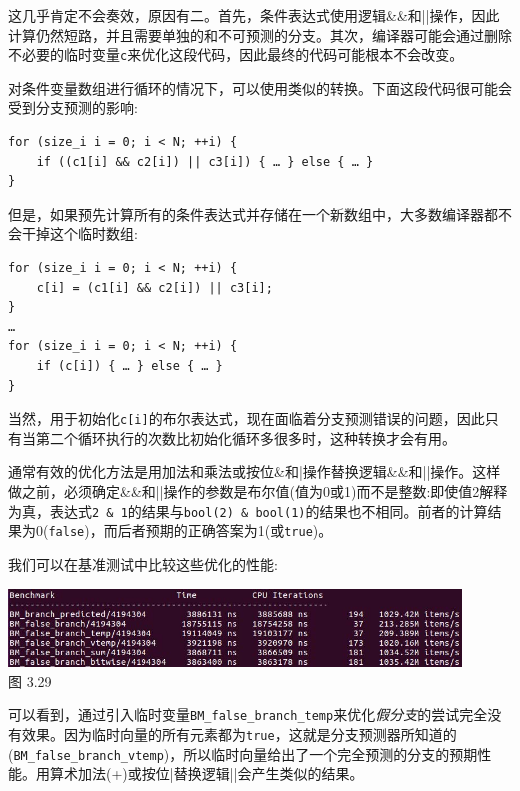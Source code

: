 这几乎肯定不会奏效，原因有二。首先，条件表达式使用逻辑\&\&和||操作，因此计算仍然短路，并且需要单独的和不可预测的分支。其次，编译器可能会通过删除不必要的临时变量\texttt{c}来优化这段代码，因此最终的代码可能根本不会改变。

对条件变量数组进行循环的情况下，可以使用类似的转换。下面这段代码很可能会受到分支预测的影响:

\begin{lstlisting}[style=styleCXX]
for (size_i i = 0; i < N; ++i) {
	if ((c1[i] && c2[i]) || c3[i]) { … } else { … }
}
\end{lstlisting}

但是，如果预先计算所有的条件表达式并存储在一个新数组中，大多数编译器都不会干掉这个临时数组:

\begin{lstlisting}[style=styleCXX]
for (size_i i = 0; i < N; ++i) {
	c[i] = (c1[i] && c2[i]) || c3[i];
}
…
for (size_i i = 0; i < N; ++i) {
	if (c[i]) { … } else { … }
}
\end{lstlisting}

当然，用于初始化\texttt{c[i]}的布尔表达式，现在面临着分支预测错误的问题，因此只有当第二个循环执行的次数比初始化循环多很多时，这种转换才会有用。

通常有效的优化方法是用加法和乘法或按位\&和|操作替换逻辑\&\&和||操作。这样做之前，必须确定\&\&和||操作的参数是布尔值(值为0或1)而不是整数:即使值2解释为真，表达式\texttt{2 \& 1}的结果与\texttt{bool(2) \& bool(1)}的结果也不相同。前者的计算结果为0(\texttt{false})，而后者预期的正确答案为1(或\texttt{true})。

我们可以在基准测试中比较这些优化的性能:

\begin{center}
\includegraphics[width=0.9\textwidth]{content/1/chapter3/images/29.jpg}\\
图 3.29
\end{center}

可以看到，通过引入临时变量\texttt{BM\_false\_branch\_temp}来优化\textit{假分支}的尝试完全没有效果。因为临时向量的所有元素都为\texttt{true}，这就是分支预测器所知道的(\texttt{BM\_false\_branch\_vtemp})，所以临时向量给出了一个完全预测的分支的预期性能。用算术加法(+)或按位|替换逻辑||会产生类似的结果。

